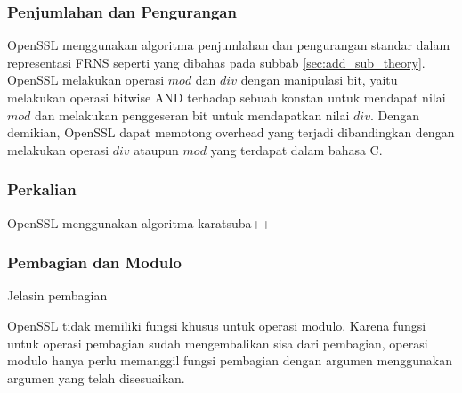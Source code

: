 \subsubsection{Penjumlahan dan Pengurangan}
OpenSSL menggunakan algoritma penjumlahan dan pengurangan standar dalam representasi FRNS seperti yang dibahas pada subbab \ref{sec:add_sub_theory}. OpenSSL melakukan operasi $mod$ dan $div$ dengan manipulasi bit, yaitu melakukan operasi bitwise AND terhadap sebuah konstan untuk mendapat nilai $mod$ dan melakukan penggeseran bit untuk mendapatkan nilai $div$. Dengan demikian, OpenSSL dapat memotong overhead yang terjadi dibandingkan dengan melakukan operasi $div$ ataupun $mod$ yang terdapat dalam bahasa C.

\subsubsection{Perkalian}
OpenSSL menggunakan algoritma karatsuba++

\subsubsection{Pembagian dan Modulo}
Jelasin pembagian

OpenSSL tidak memiliki fungsi khusus untuk operasi modulo. Karena fungsi untuk operasi pembagian sudah mengembalikan sisa dari pembagian, operasi modulo hanya perlu memanggil fungsi pembagian dengan argumen menggunakan argumen yang telah disesuaikan.
